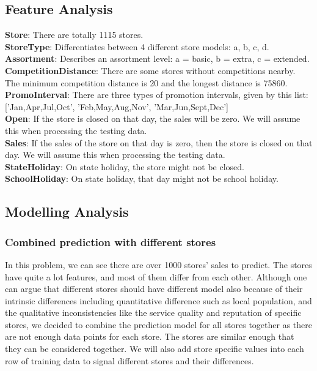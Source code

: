 \documentclass{article}
\begin{document}
\subsection{Feature Analysis}
\textbf{Store}: There are totally 1115 stores.\\
\textbf{StoreType}: Differentiates between 4 different store models: a, b, c, d.\\
\textbf{Assortment}: Describes an assortment level: a = basic, b = extra, c = extended.\\
\textbf{CompetitionDistance}: There are some stores without competitions nearby. The minimum competition distance is 20 and the longest distance is 75860.\\
\textbf{PromoInterval}: There are three types of promotion intervals, given by this list: ['Jan,Apr,Jul,Oct', 'Feb,May,Aug,Nov', 'Mar,Jun,Sept,Dec']\\
\textbf{Open}: If the store is closed on that day, the sales will be zero. We will assume this when processing the testing data.\\
\textbf{Sales}: If the sales of the store on that day is zero, then the store is closed on that day. We will assume this when processing the testing data.\\
\textbf{StateHoliday}: On state holiday, the store might not be closed.\\
\textbf{SchoolHoliday}: On state holiday, that day might not be school holiday.
\subsection{Modelling Analysis}
\subsubsection{Combined prediction with different stores}
In this problem, we can see there are over 1000 stores' sales to predict. The stores have quite a lot features, and most of them differ from each other. Although one can argue that different stores should have different model also because of their intrinsic differences including quantitative difference such as local population, and the qualitative inconsistencies like the service quality and reputation of specific stores, we decided to combine the prediction model for all stores together as there are not enough data points for each store. The stores are similar enough that they can be considered together. We will also add store specific values into each row of training data to signal different stores and their differences.
\end{document}
